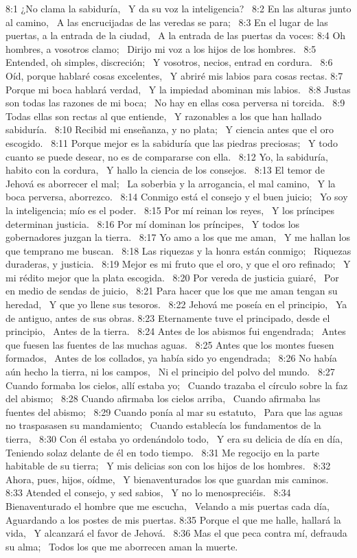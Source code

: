 8:1 ¿No clama la sabiduría,  
Y da su voz la inteligencia?  
8:2 En las alturas junto al camino,  
A las encrucijadas de las veredas se para;  
8:3 En el lugar de las puertas, a la entrada de la ciudad,  
A la entrada de las puertas da voces: 
8:4 Oh hombres, a vosotros clamo;  
Dirijo mi voz a los hijos de los hombres.  
8:5 Entended, oh simples, discreción;  
Y vosotros, necios, entrad en cordura.  
8:6 Oíd, porque hablaré cosas excelentes,  
Y abriré mis labios para cosas rectas. 
8:7 Porque mi boca hablará verdad,  
Y la impiedad abominan mis labios.  
8:8 Justas son todas las razones de mi boca;  
No hay en ellas cosa perversa ni torcida.  
8:9 Todas ellas son rectas al que entiende,  
Y razonables a los que han hallado sabiduría.  
8:10 Recibid mi enseñanza, y no plata;  
Y ciencia antes que el oro escogido.  
8:11 Porque mejor es la sabiduría que las piedras preciosas;  
Y todo cuanto se puede desear, no es de compararse con ella.  
8:12 Yo, la sabiduría, habito con la cordura,  
Y hallo la ciencia de los consejos.  
8:13 El temor de Jehová es aborrecer el mal;  
La soberbia y la arrogancia, el mal camino,  
Y la boca perversa, aborrezco.  
8:14 Conmigo está el consejo y el buen juicio;  
Yo soy la inteligencia; mío es el poder.  
8:15 Por mí reinan los reyes,  
Y los príncipes determinan justicia.  
8:16 Por mí dominan los príncipes,  
Y todos los gobernadores juzgan la tierra.  
8:17 Yo amo a los que me aman,  
Y me hallan los que temprano me buscan.  
8:18 Las riquezas y la honra están conmigo;  
Riquezas duraderas, y justicia.  
8:19 Mejor es mi fruto que el oro, y que el oro refinado;  
Y mi rédito mejor que la plata escogida.  
8:20 Por vereda de justicia guiaré,  
Por en medio de sendas de juicio,  
8:21 Para hacer que los que me aman tengan su heredad,  
Y que yo llene sus tesoros.  
8:22 Jehová me poseía en el principio,  
Ya de antiguo, antes de sus obras. 
8:23 Eternamente tuve el principado, desde el principio,  
Antes de la tierra.  
8:24 Antes de los abismos fui engendrada;  
Antes que fuesen las fuentes de las muchas aguas.  
8:25 Antes que los montes fuesen formados,  
Antes de los collados, ya había sido yo engendrada;  
8:26 No había aún hecho la tierra, ni los campos,  
Ni el principio del polvo del mundo.  
8:27 Cuando formaba los cielos, allí estaba yo;  
Cuando trazaba el círculo sobre la faz del abismo;  
8:28 Cuando afirmaba los cielos arriba,  
Cuando afirmaba las fuentes del abismo;  
8:29 Cuando ponía al mar su estatuto,  
Para que las aguas no traspasasen su mandamiento;  
Cuando establecía los fundamentos de la tierra,  
8:30 Con él estaba yo ordenándolo todo,  
Y era su delicia de día en día,  
Teniendo solaz delante de él en todo tiempo.  
8:31 Me regocijo en la parte habitable de su tierra;  
Y mis delicias son con los hijos de los hombres.  
8:32 Ahora, pues, hijos, oídme,  
Y bienaventurados los que guardan mis caminos.  
8:33 Atended el consejo, y sed sabios,  
Y no lo menospreciéis.  
8:34 Bienaventurado el hombre que me escucha,  
Velando a mis puertas cada día,  
Aguardando a los postes de mis puertas. 
8:35 Porque el que me halle, hallará la vida,  
Y alcanzará el favor de Jehová.  
8:36 Mas el que peca contra mí, defrauda su alma;  
Todos los que me aborrecen aman la muerte. 
